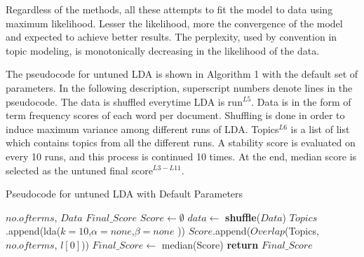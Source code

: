 \documentclass[conference]{IEEEtran}
\theoremstyle{break}
\begin{document}
Regardless of the methods, all these attempts to fit the model to data using maximum likelihood. Lesser the likelihood, more the convergence of the model and expected to achieve better results. The perplexity, used by convention in topic modeling, is monotonically decreasing in the likelihood of the data.

The pseudocode for untuned LDA is shown in Algorithm 1 with the default set of parameters. In the following description, superscript numbers denote lines in the pseudocode. The data is shuffled everytime LDA is run$^{L5}$. Data is in the form of term frequency scores of each word per document. Shuffling is done in order  to  induce  maximum  variance  among  different  runs of LDA. Topics$^{L6}$ is a list of list which contains topics from all the different runs. A stability score is evaluated on every 10 runs, and this process is continued 10 times. At the end, median score is selected as the untuned final score$^{L3-L11}$.

\makeatletter
\algrenewcommand\ALG@beginalgorithmic{\footnotesize}
\algrenewcommand{}
\makeatother
\renewcommand{\algorithmicrequire}{\textbf{Input:}}
\renewcommand{\algorithmicensure}{\textbf{Output:}}
\begin{algorithm}[!htb]
    \caption{Pseudocode for untuned LDA with Default Parameters}
    \begin{algorithmic}[1]
    \Require $no. of terms$, $Data$
    \Ensure $Final\_Score$    
        \State $Score \leftarrow \emptyset$
                \State $data \leftarrow$ \textbf{shuffle}($Data$)
                \State $Topics$.append(lda($k=10$,$\alpha=none$,$\beta=none$ ))
            \EndFor
            \State $Score$.append($Overlap$(Topics, $no. of terms$, $l[0]$))
        \EndFor
        \State $Final\_Score \leftarrow $ median(Score)
        \State \textbf{return} $Final\_Score$
    \EndFunction
    \end{algorithmic}
\end{algorithm}
\end{document}
